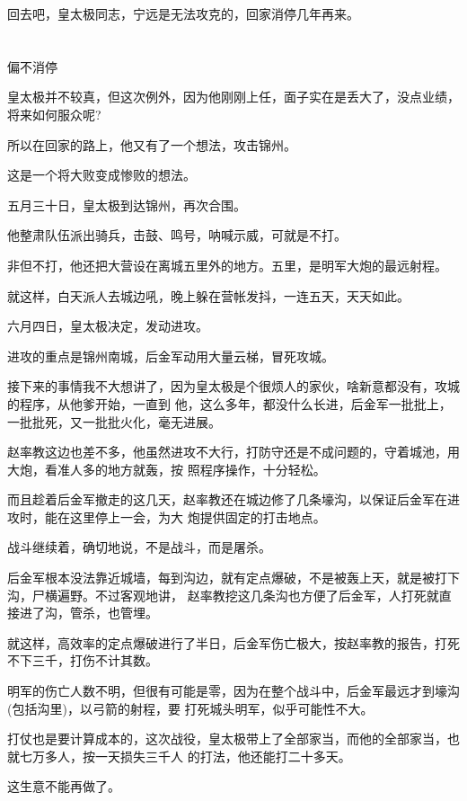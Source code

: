 \documentclass[11pt,a4paper,onecolumn]{article}
\begin{document}
回去吧，皇太极同志，宁远是无法攻克的，回家消停几年再来。

\section[\thesection]{}

偏不消停

皇太极并不较真，但这次例外，因为他刚刚上任，面子实在是丢大了，没点业绩，将来如何服众呢?

所以在回家的路上，他又有了一个想法，攻击锦州。

这是一个将大败变成惨败的想法。

五月三十日，皇太极到达锦州，再次合围。

他整肃队伍派出骑兵，击鼓、鸣号，呐喊示威，可就是不打。

非但不打，他还把大营设在离城五里外的地方。五里，是明军大炮的最远射程。

就这样，白天派人去城边吼，晚上躲在营帐发抖，一连五天，天天如此。

六月四日，皇太极决定，发动进攻。

进攻的重点是锦州南城，后金军动用大量云梯，冒死攻城。

接下来的事情我不大想讲了，因为皇太极是个很烦人的家伙，啥新意都没有，攻城的程序，从他爹开始，一直到
他，这么多年，都没什么长进，后金军一批批上，一批批死，又一批批火化，毫无进展。

赵率教这边也差不多，他虽然进攻不大行，打防守还是不成问题的，守着城池，用大炮，看准人多的地方就轰，按
照程序操作，十分轻松。

而且趁着后金军撤走的这几天，赵率教还在城边修了几条壕沟，以保证后金军在进攻时，能在这里停上一会，为大
炮提供固定的打击地点。

战斗继续着，确切地说，不是战斗，而是屠杀。

后金军根本没法靠近城墙，每到沟边，就有定点爆破，不是被轰上天，就是被打下沟，尸横遍野。不过客观地讲，
赵率教挖这几条沟也方便了后金军，人打死就直接进了沟，管杀，也管埋。

就这样，高效率的定点爆破进行了半日，后金军伤亡极大，按赵率教的报告，打死不下三千，打伤不计其数。

明军的伤亡人数不明，但很有可能是零，因为在整个战斗中，后金军最远才到壕沟(包括沟里)，以弓箭的射程，要
打死城头明军，似乎可能性不大。

打仗也是要计算成本的，这次战役，皇太极带上了全部家当，而他的全部家当，也就七万多人，按一天损失三千人
的打法，他还能打二十多天。

这生意不能再做了。
\end{document}
